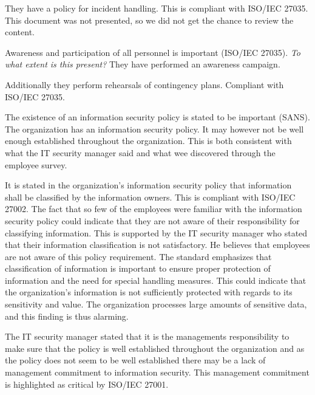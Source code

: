 They have a policy for incident handling. This is compliant with ISO/IEC 27035. This document was not presented, so we did not get the chance to review the content.

Awareness and participation of all personnel is important (ISO/IEC 27035). \textit{To what extent is this present?} They have performed an awareness campaign. 

Additionally they perform rehearsals of contingency plans. Compliant with ISO/IEC 27035.

The existence of an information security policy is stated to be important (SANS). The organization has an information security policy. It may however not be well enough established throughout the organization. This is both consistent with what the IT security manager said and what wee discovered through the employee survey.

It is stated in the organization's information security policy that information shall be classified by the information owners. This is compliant with ISO/IEC 27002. The fact that so few of the employees were familiar with the information security policy could indicate that they are not aware of their responsibility for classifying information. This is supported by the IT security manager who stated that their information classification is not satisfactory. He believes that employees are not aware of this policy requirement. The standard emphasizes that classification of information is important to ensure proper protection of information and the need for special handling measures. This could indicate that the organization's information is not sufficiently protected with regards to its sensitivity and value. The organization processes large amounts of sensitive data, and this finding is thus alarming.

The IT security manager stated that it is the managements responsibility to make sure that the policy is well established throughout the organization and as the policy does not seem to be well established there may be a lack of management commitment to information security. This management commitment is highlighted as critical by ISO/IEC 27001. 




